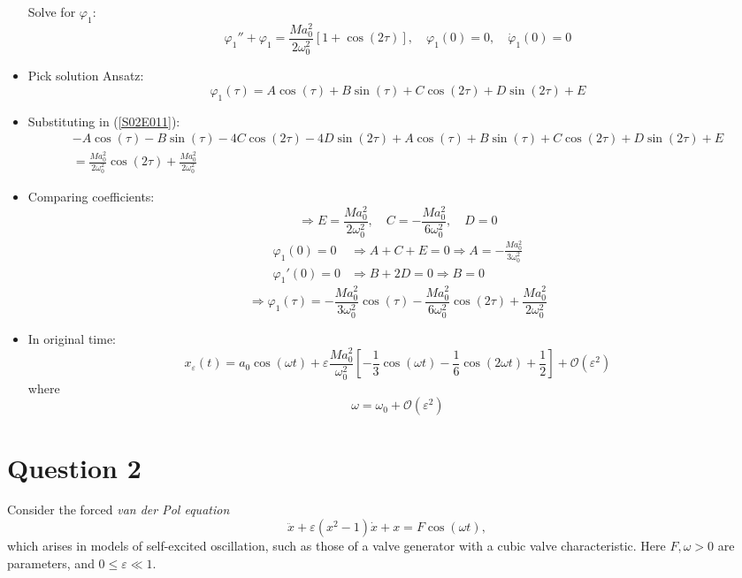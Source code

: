 \documentclass[twoside,10pt,a4paper]{article}
\begin{document}
\begin{itemize}
	Solve for $\varphi_1$:
	\begin{equation} \label{S02E011}
		\varphi_1'' + \varphi_1 = \frac{Ma_0^2}{2\omega_0^2}[1 + \cos(2\tau)], \quad \varphi_1(0)=0, \quad \dot{\varphi}_1(0)=0
	\end{equation}
	\item Pick solution Ansatz:
	\begin{equation*}
		\varphi_1(\tau) = A\cos(\tau) + B\sin(\tau) + C\cos(2\tau) + D\sin(2\tau) + E
	\end{equation*}
	\item Substituting in (\ref{S02E011}):
	\begin{align*}
		-A\cos(\tau) - B\sin(\tau) - 4C\cos(2\tau) - 4D\sin(2\tau) + A\cos(\tau) + B\sin(\tau) + C\cos(2\tau) + D\sin(2\tau) + E \\
		= \frac{Ma_0^2}{2\omega_0^2}\cos(2\tau) + \frac{Ma_0^2}{2\omega_0^2}
	\end{align*}
	\item Comparing coefficients:
	\begin{equation*}
		\Longrightarrow E = \frac{Ma_0^2}{2\omega_0^2}, \quad C = -\frac{Ma_0^2}{6\omega_0^2},\quad D=0
	\end{equation*}
	\begin{align*}
		\varphi_1(0)=0 &\Longrightarrow A+C+E=0 \Longrightarrow A = -\frac{Ma_0^2}{3\omega_0^2} \\
		\varphi_1'(0)=0 &\Longrightarrow B+2D=0 \Longrightarrow B=0
	\end{align*}
	\begin{equation*}
		\Longrightarrow \boxed{\varphi_1(\tau) = -\frac{Ma_0^2}{3\omega_0^2}\cos(\tau) - \frac{Ma_0^2}{6\omega_0^2}\cos(2\tau) + \frac{Ma_0^2}{2\omega_0^2}}
	\end{equation*}
	\item In original time:
	\begin{equation*}
		x_\varepsilon(t) = a_0\cos(\omega t) + \varepsilon \frac{Ma_0^2}{\omega_0^2} \left[ -\frac{1}{3}\cos(\omega t) - \frac{1}{6}\cos(2\omega t) + \frac{1}{2} \right] + \mathcal{O}(\varepsilon^2)
	\end{equation*}
	where
	\begin{equation*}
		\omega = \omega_0 + \mathcal{O}(\varepsilon^2)
	\end{equation*}
\end{itemize}

\newpage
\section*{Question 2}
Consider the forced \textit{van der Pol equation}
\begin{equation*}
	\ddot{x} + \varepsilon(x^2 - 1)\dot{x} + x = F\cos(\omega t),
\end{equation*} 
which arises in models of self-excited oscillation, such as those of a valve generator with a cubic valve characteristic. Here $F, \omega > 0$ are parameters, and $0 \leq \varepsilon \ll 1$.
\end{document}
